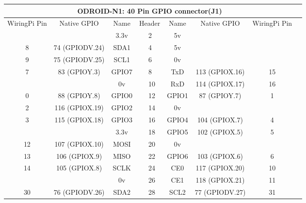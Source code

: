 \documentclass[12pt,a4paper]{article}
\begin{document}
\begin{sffamily}
\begin{center}
\begin{tabular}{|c|c|c||p{8mm}|p{8mm}||c|c|c|c|}
\hline
\multicolumn{8}{|c|}{\bfseries{ODROID-N1: 40 Pin GPIO connector(J1)}}\\
\hline
\hline
WiringPi Pin	& Native GPIO	& Name	& \multicolumn{2}{|c||}{Header}	& Name	& Native GPIO	& WiringPi Pin\\
\hline
\hline
	& 		& \textcolor{rtb-red}{3.3v}	& \raggedleft{1} &  2 & \textcolor{rtb-maroon}{5v}	& 		& \\
\hline
8	& 74 (GPIODV.24)& \textcolor{rtb-aqua}{SDA1}	& \raggedleft{3} &  4 & \textcolor{rtb-maroon}{5v}	& 		& \\
\hline
9	& 75 (GPIODV.25)& \textcolor{rtb-aqua}{SCL1}	& \raggedleft{5} &  6 & \textcolor{rtb-black}{0v}	& 		& \\
\hline
7	& 83 (GPIOY.3)	& \textcolor{rtb-green}{GPIO7}	& \raggedleft{7} &  8 & \textcolor{rtb-yellow}{TxD}	& 113 (GPIOX.16)& 15\\
\hline
	& 		& \textcolor{rtb-black}{0v}	& \raggedleft{9} & 10 & \textcolor{rtb-yellow}{RxD}	& 114 (GPIOX.17)& 16\\
\hline
0	& 88 (GPIOY.8)	& \textcolor{rtb-green}{GPIO0}	& \raggedleft{11} & 12 & \textcolor{rtb-green}{GPIO1}	& 87 (GPIOY.7)	& 1\\
\hline
2	& 116 (GPIOX.19)& \textcolor{rtb-green}{GPIO2}	& \raggedleft{13} & 14 & \textcolor{rtb-black}{0v}	& 		& \\
\hline
3	& 115 (GPIOX.18)& \textcolor{rtb-green}{GPIO3}	& \raggedleft{15} & 16 & \textcolor{rtb-green}{GPIO4}	& 104 (GPIOX.7)	& 4\\
\hline
	& 		& \textcolor{rtb-red}{3.3v}	& \raggedleft{17} & 18 & \textcolor{rtb-green}{GPIO5}	& 102 (GPIOX.5)	& 5\\
\hline
12	& 107 (GPIOX.10)& \textcolor{rtb-teal}{MOSI}	& \raggedleft{19} & 20 & \textcolor{rtb-black}{0v}	& 		& \\
\hline
13	& 106 (GPIOX.9)	& \textcolor{rtb-teal}{MISO}	& \raggedleft{21} & 22 & \textcolor{rtb-green}{GPIO6}	& 103 (GPIOX.6)	& 6\\
\hline
14	& 105 (GPIOX.8)	& \textcolor{rtb-teal}{SCLK}	& \raggedleft{23} & 24 & \textcolor{rtb-teal}{CE0}	& 117 (GPIOX.20)& 10\\
\hline
	& 		& \textcolor{rtb-black}{0v}	& \raggedleft{25} & 26 & \textcolor{rtb-teal}{CE1}	& 118 (GPIOX.21)& 11\\
\hline
30	& 76 (GPIODV.26)& \textcolor{rtb-green}{SDA2}	& \raggedleft{27} & 28 & \textcolor{rtb-green}{SCL2}	& 77 (GPIODV.27)& 31\\

\end{tabular}
\end{center}
\end{sffamily}
\end{document}
